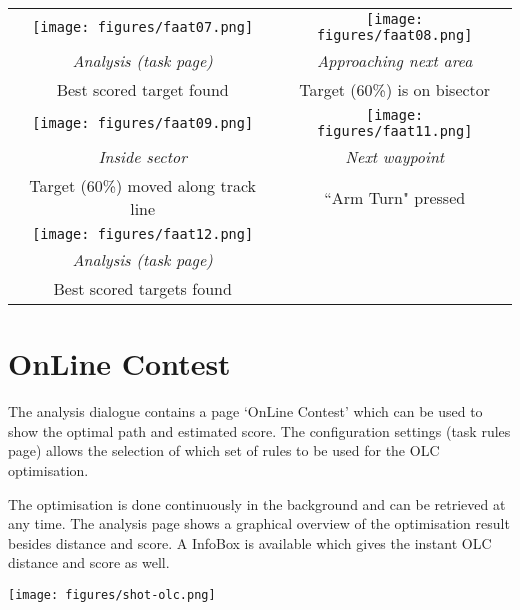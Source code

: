 \begin{maxipage}
\begin{center}
\begin{longtable}{|c|c|}
\toprule
\texttt{[image: figures/faat07.png]} & 
\texttt{[image: figures/faat08.png]} \\
{\em Analysis (task page)} & {\em Approaching next area} \\
Best scored target found & Target (60\%) is on bisector \\

\midrule
\texttt{[image: figures/faat09.png]} & 
\texttt{[image: figures/faat11.png]} \\
{\em Inside sector} & {\em Next waypoint} \\
Target (60\%) moved along track line & ``Arm Turn" pressed \\

\midrule
\texttt{[image: figures/faat12.png]} &  \\
{\em Analysis (task page)} &  \\
Best scored targets found &  \\

\bottomrule
\end{longtable}
\end{center}
\end{maxipage}

\section{OnLine Contest}

The analysis dialogue contains a page `OnLine Contest' which can be
used to show the optimal path and estimated score.  The configuration settings  
(task rules page) allows the selection of which set of rules to be used for the
OLC optimisation.

The optimisation is done continuously in the background and can be retrieved at
any time. The analysis page shows a graphical overview of the optimisation
result besides distance and score. A InfoBox is available which gives the
instant OLC distance and score as well.

\begin{center}
\texttt{[image: figures/shot-olc.png]}
\end{center}

